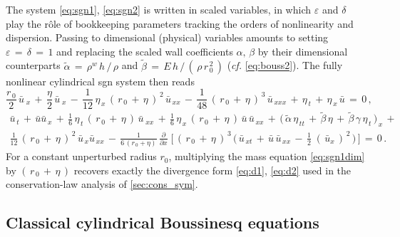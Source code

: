 \documentclass[alpha-refs, 12pt]{wiley-article}
\newcommand{\eps}{\varepsilon}
\begin{document}
The system \eqref{eq:sgn1}, \eqref{eq:sgn2} is written in scaled variables, in which $\eps$ and $\delta$ play the r\^ole of bookkeeping parameters tracking the orders of nonlinearity and dispersion. Passing to dimensional (physical) variables amounts to setting $\eps\,=\,\delta\,=\,1$ and replacing the scaled wall coefficients $\alpha,\,\beta$ by their dimensional counterparts $\tilde{\alpha}\,=\,\rho^{w}\,h\,/\,\rho$ and $\tilde{\beta}\,=\,E\,h\,/\,(\,\rho\,r_{\,0}^{\,2}\,)$ (\emph{cf.} \eqref{eq:bouss2}). The fully nonlinear cylindrical \acrshort{sgn} system then reads
\begin{equation}\label{eq:sgn1dim}
  \frac{r_{\,0}}{2}\,\bar{u}_{\;x}\,+\,\frac{\eta}{2}\,\bar{u}_{\;x}\,-\,\frac{1}{12}\,\eta_{\,x}\,(\,r_{\,0}\,+\,\eta\,)^{\,2}\,\bar{u}_{\,xx}\,-\,\frac{1}{48}\,(\,r_{\,0}\,+\,\eta\,)^{\,3}\,\bar{u}_{\,xxx}\,+\,\eta_{\,t}\,+\,\eta_{\,x}\,\bar{u}\,=\,0\,,
\end{equation}
\begin{multline}\label{eq:sgn2dim}
  \bar{u}_{\,t}\,+\,\bar{u}\bar{u}_{\,x}\,+\,\frac{1}{6}\,\eta_{\,t}\,(\,r_{\,0}\,+\,\eta\,)\,\bar{u}_{\;xx}\,+\,\frac{1}{6}\,\eta_{\,x}\,(\,r_{\,0}\,+\,\eta\,)\,\bar{u}\,\bar{u}_{\,xx}\,+\,\bigl(\,\tilde{\alpha}\,\eta_{\,tt}\,+\,\tilde{\beta}\,\eta\,+\,\tilde{\beta}\,\gamma\,\eta_{\,t}\,\bigr)_{\,x}\,+\\
  \frac{1}{12}\,(\,r_{\,0}\,+\,\eta\,)^{\,2}\,\bar{u}_{\,x}\bar{u}_{\,xx}\,-\,\frac{1}{6\,(r_{\,0}+\eta)}\,\frac{\partial}{\partial x}\;\biggl[\,(\,r_{\,0}\,+\,\eta\,)^{\,3}\,\bigl(\,\bar{u}_{\,xt}\,+\,\bar{u}\,\bar{u}_{\,xx}\,-\,\frac{1}{2}\;(\,\bar{u}_{x}\,)^{\,2}\,\bigr)\,\biggr]\,=\,0\,.
\end{multline}
For a constant unperturbed radius $r_{0}$, multiplying the mass equation \eqref{eq:sgn1dim} by $(\,r_{\,0}\,+\,\eta\,)$ recovers exactly the divergence form \eqref{eq:d1}, \eqref{eq:d2} used in the conservation-law analysis of \cref{sec:cons_sym}.

\subsection{Classical cylindrical Boussinesq equations}
\end{document}
